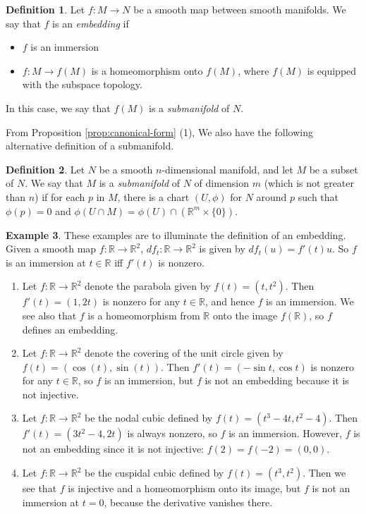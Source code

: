 \documentclass{amsart}
\numberwithin{equation}{section}
\newcommand{\bR}{\mathbb{R}}
\theoremstyle{definition}
\newtheorem{definition}{Definition} [section]
\newtheorem{example}[definition]{Example}
\theoremstyle{theorem}
\begin{document}
\begin{definition}
Let $f : M \to N$ be a smooth map between smooth manifolds. We say that $f$ is an 
{\em embedding} if 
\begin{itemize}
\item $f$ is an immersion 
\item $f : M \to f(M)$ is a homeomorphism onto $f(M)$, where $f(M)$ is equipped 
with the subspace topology. 
\end{itemize}
In this case, we say that $f(M)$ is a {\em submanifold} of $N$.
\end{definition}

From Proposition \ref{prop:canonical-form} (1), 
We also have the following alternative definition of a submanifold. 

\begin{definition}
Let $N$ be a smooth $n$-dimensional manifold, and let $M$ be a subset of $N$. 
We say that $M$ is a {\em submanifold} of $N$ of dimension $m$ (which is not greater than $n$) 
if for each $p$ in $M$, there is a chart $(U,\phi)$ for $N$ around $p$ such that 
$\phi(p)=0$ and $\phi(U \cap M) = \phi(U) \cap (\bR^m \times \{0\})$. 
\end{definition}

\begin{example}
These examples are to illuminate the definition of an embedding. 
Given a smooth map $f:\bR\to \bR^2$, $df_t:\bR\to \bR^2$ is given by 
$df_t(u)=f'(t)u$. So $f$ is an immersion at $t\in \bR$ iff $f'(t)$ is nonzero.
\begin{enumerate}
\item Let $f : \bR \to \bR^2$ denote the parabola given by  $f(t) = (t,t^2)$. Then $f'(t)=(1,2t)$ is nonzero for any $t\in \bR$, 
and hence $f$ is an immersion. We see also that $f$ is a homeomorphism from $\bR$ onto the 
image $f(\bR)$, so $f$ defines an embedding. 

\item  Let $f : \bR \to \bR^2$ denote the covering of the unit circle given by $f(t) = (\cos(t), \sin(t))$. 
Then $f'(t)=(-\sin t,\cos t)$ is nonzero for any $t\in \bR$, so $f$ is an immersion, but $f$ is not an embedding because 
it is not injective. 

\item  Let $f : \bR \to \bR^2$ be the nodal cubic defined by $f(t) = (t^3 - 4t, t^2 - 4)$. 
Then $f'(t)=(3t^2-4, 2t)$ is always nonzero, so $f$ is an immersion. However, $f$ is not an embedding since it is not injective: $f(2)=f(-2)=(0,0)$.

\item  Let $f : \bR \to \bR^2$ be the cuspidal cubic defined by $f(t) = (t^3, t^2)$. Then we see that $f$ is injective and a homeomorphism onto its image, but $f$ is not an immersion at $t = 0$, because the derivative vanishes there.
\end{enumerate}
\end{example}
\end{document}

